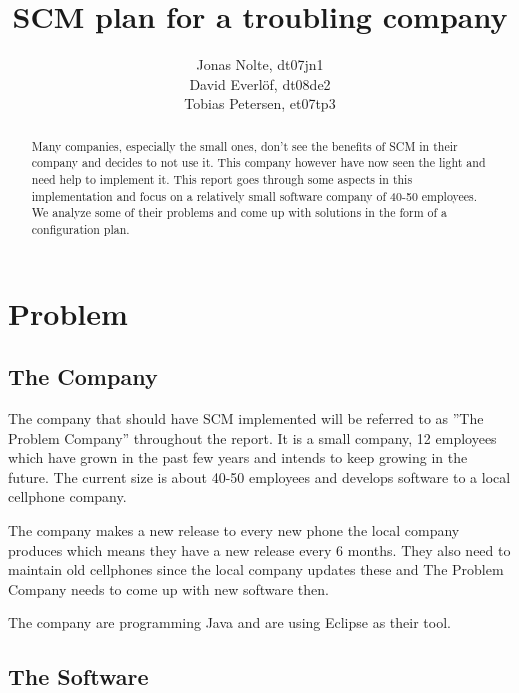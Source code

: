 \documentclass[a4paper,11pt]{article}
\title{SCM plan for a troubling company}
\author{Jonas Nolte, dt07jn1\\
David Everlöf, dt08de2\\
Tobias Petersen, et07tp3}
\begin{document}
\maketitle

\begin{abstract}
Many companies, especially the small ones, don't see the benefits of SCM in their company and decides to not use it.
This company however have now seen the light and need help to implement it.
This report goes through some aspects in this implementation and focus on a relatively small software company of 40-50 employees.
We analyze some of their problems and come up with solutions in the form of a configuration plan.
\end{abstract}
\newpage

\tableofcontents
\newpage

\section{Problem}

\subsection{The Company}

The company that should have SCM implemented will be referred to as ''The Problem Company'' throughout the report.
It is a small company, 12 employees which have grown in the past few years and intends to keep growing in the future.
The current size is about 40-50 employees and develops software to a local cellphone company.

The company makes a new release to every new phone the local company produces which means they have a new release every 6 months.
They also need to maintain old cellphones since the local company updates these and The Problem Company needs to come up with new software then.

The company are programming Java and are using Eclipse as their tool.

\subsection{The Software}
\end{document}
